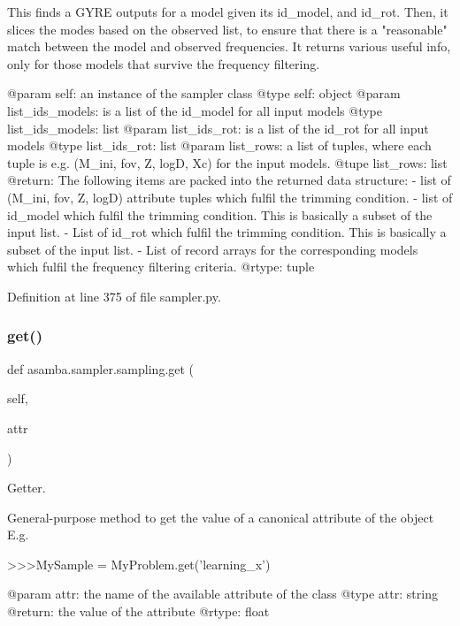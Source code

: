 \begin{DoxyVerb}This finds a GYRE outputs for a model given its id_model, and id_rot. Then, it slices the
modes based on the observed list, to ensure that there is a "reasonable" match between the
model and observed frequencies. It returns various useful info, only for those models that
survive the frequency filtering.

@param self: an instance of the sampler class
@type self: object
@param list_ids_models: is a list of the id_model for all input models
@type list_ids_models: list
@param list_ids_rot: is a list of the id_rot for all input models
@type list_ids_rot: list
@param list_rows: a list of tuples, where each tuple is e.g. (M_ini, fov, Z, logD, Xc) for
     the input models. 
@tupe list_rows: list
@return: The following items are packed into the returned data structure:
   - list of (M_ini, fov, Z, logD) attribute tuples which fulfil the trimming condition. 
   - list of id_model which fulfil the trimming condition. This is basically
     a subset of the input list.
   - List of id_rot which fulfil the trimming condition. This is basically
     a subset of the input list.
   - List of record arrays for the corresponding models which fulfil the frequency
     filtering criteria.
@rtype: tuple
\end{DoxyVerb}
 

Definition at line 375 of file sampler.\+py.

\mbox{\label{classasamba_1_1sampler_1_1sampling_a9e11f6bf4371b3dbe372dcc75c47ad3a}} 
\subsubsection{\texorpdfstring{get()}{get()}}
{\footnotesize\ttfamily def asamba.\+sampler.\+sampling.\+get (\begin{DoxyParamCaption}\item[{}]{self,  }\item[{}]{attr }\end{DoxyParamCaption})}



Getter. 

\begin{DoxyVerb}General-purpose method to get the value of a canonical attribute of the object
E.g.

>>>MySample = MyProblem.get('learning_x')

@param attr: the name of the available attribute of the class
@type attr: string
@return: the value of the attribute
@rtype: float
\end{DoxyVerb}
 

